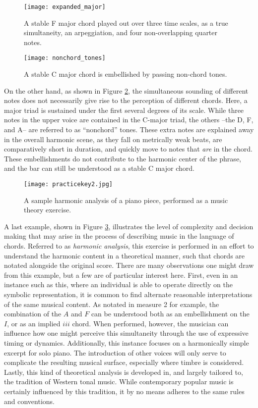 \begin{figure}[t]
\centering
\texttt{[image: expanded\_major]}
\caption{A stable F major chord played out over three time scales, as a true simultaneity, an arpeggiation, and four non-overlapping quarter notes.}
\label{fig:expanded_major}
\end{figure}

\begin{figure}[t]
\centering
\texttt{[image: nonchord\_tones]}
\caption{A stable C major chord is embellished by passing non-chord tones.}
\label{fig:nonchord_tones}
\end{figure}

On the other hand, as shown in Figure \ref{fig:nonchord_tones}, the simultaneous sounding of different notes does not necessarily give rise to the perception of different chords.
Here, a major triad is sustained under the first several degrees of its scale.
While three notes in the upper voice are contained in the C-major triad, the others --the D, F, and A-- are referred to as ``nonchord'' tones.
These extra notes are explained away in the overall harmonic scene, as they fall on metrically weak beats, are comparatively short in duration, and quickly move to notes that \emph{are} in the chord.
These embellishments do not contribute to the harmonic center of the phrase, and the bar can still be understood as a stable C major chord.


\begin{figure}[t]
\centering
\texttt{[image: practicekey2.jpg]}
\caption{A sample harmonic analysis of a piano piece, performed as a music theory exercise.}
\label{fig:mthomework}
\end{figure}

A last example, shown in Figure \ref{fig:mthomework}, illustrates the level of complexity and decision making that may arise in the process of describing music in the language of chords.
Referred to as \emph{harmonic analysis}, this exercise is performed in an effort to understand the harmonic content in a theoretical manner, such that chords are notated alongside the original score.
There are many observations one might draw from this example, but a few are of particular interest here.
First, even in an instance such as this, where an individual is able to operate directly on the symbolic representation, it is common to find alternate reasonable interpretations of the same musical content.
As notated in measure 2 for example, the combination of the $A$ and $F$ can be understood both as an embellishment on the $I$, or as an implied $iii$ chord.
When performed, however, the musician can influence how one might perceive this simultaneity through the use of expressive timing or dynamics.
Additionally, this instance focuses on a harmonically simple excerpt for solo piano.
The introduction of other voices will only serve to complicate the resulting musical surface, especially where timbre is considered.
Lastly, this kind of theoretical analysis is developed in, and largely tailored to, the tradition of Western tonal music.
While contemporary popular music is certainly influenced by this tradition, it by no means adheres to the same rules and conventions.


